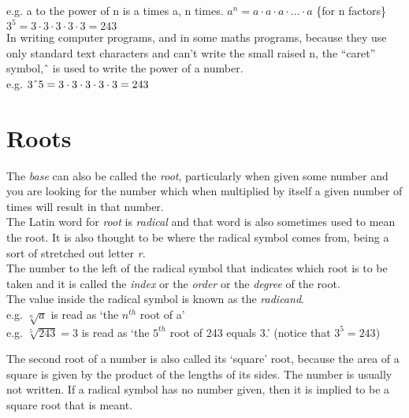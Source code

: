 \documentclass{article}
\begin{document}
e.g.	a to the power of n is a times a, n times.
	${a^n = a\cdot a\cdot a \cdot ... \cdot a}$ \{for n factors\}
	${3^5 = 3 \cdot 3 \cdot 3 \cdot 3 \cdot 3 = 243}$\\

In writing computer programs, and in some maths programs, because they use only standard text characters and can’t write the small raised n, the “caret” symbol, \^\, is used to write the power of a number.\\

e.g.	$3 \string^ 5 = 3 \cdot 3 \cdot 3 \cdot 3 \cdot 3 = 243$

\newpage

\section{Roots}

The \textit{base} can also be called the \textit{root}, particularly when given some number and you are looking for the number which when multiplied by itself a given number of times will result in that number.\\

The Latin word for \textit{root} is \textit{radical} and that word is also sometimes used to mean the root. It is also thought to be where the radical symbol \textsurd \enspace comes from, being a sort of stretched out letter \textit{r}.\\

The number to the left of the radical symbol that indicates which root is to be taken and it is called the \textit{index} or the \textit{order} or the \textit{degree} of the root.\\

The value inside the radical symbol is known as the \textit{radicand}.\\

e.g.	$\sqrt[n]{a}$ is read as ‘the $n^{th}$ root of a’\\

e.g.	$\sqrt[5]{243}=3$ is read as ‘the $5^{th}$ root of 243 equals 3.’ (notice that $3^5 = 243$)\\

\newpage

The second root of a number is also called its ‘square’ root, because the area of a square is given by the product of the lengths of its sides. The number is usually not written. If a radical symbol has no number given, then it is implied to be a square root that is meant.\\
\end{document}
